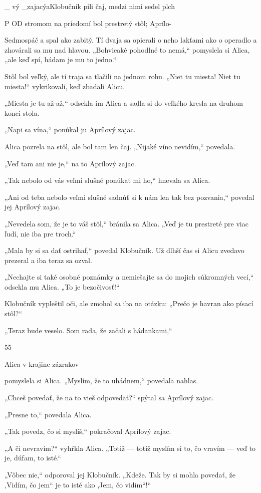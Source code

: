 \documentclass[12pt]{article}
\begin{document}
\begin{Parallel}[p]{}{}
{{_ vý _zajacýaKlobučník pili čaj, medzi nimi sedel plch

P OD stromom na priedomí bol prestretý stôl; Aprílo-

Sedmospáč a spal ako zabitý. Tí dvaja sa opierali o neho
lakťami ako o operadlo a zhovárali sa mu nad hlavou.
„Bohvieaké pohodlné to nemá,“ pomyslela si Alica, „ale
keď spí, hádam je mu to jedno.“

Stôl bol veľký, ale tí traja sa tlačili na jednom rohu. „Niet
tu miesta! Niet tu miesta!“ vykrikovali, keď zbadali Alicu.

„Miesta je tu až-až,“ odsekla im Alica a sadla si do
veľkého kresla na druhom konci stola.

„Napi sa vína,“ ponúkal ju Aprílový zajac.

Alica pozrela na stôl, ale bol tam len čaj. „Nijaké víno
nevidím,“ povedala.

„Veď tam ani nie je,“ na to Aprílový zajac.

„Tak nebolo od vás veľmi slušné ponúkať mi ho,“ hnevala
sa Alica.

„Ani od teba nebolo veľmi slušné sadnúť si k nám len tak
bez pozvania,“ povedal jej Aprílový zajac.

„Nevedela som, že je to váš stôl,“ bránila sa Alica. „Veď
je tu prestreté pre viac ľudí, nie iba pre troch.“

„Mala by si sa dať ostrihaf,“ povedal Klobučník. Už dlhší
čas si Alicu zvedavo prezeral a iba teraz sa ozval.

„Nechajte si také osobné poznámky a nemiešajte sa do
mojich súkromných vecí,“ odsekla mu Alica. „To je
bezočivosť!“

Klobučník vypleštil oči, ale zmohol sa iba na otázku:
„Prečo je havran ako písací stôl?“

„Teraz bude veselo. Som rada, že začali s hádankami,“

55

Alica v krajine zázrakov

pomyslela si Alica. „Myslím, že to uhádnem,“ povedala
nahlas.

„Chceš povedať, že na to vieš odpovedať?“ spýtal sa
Aprílový zajac.

„Presne to,“ povedala Alica.

„Tak povedz, čo si myslíš,“ pokračoval Aprílový zajac.

„A či nevravím?“ vyhŕkla Alica. „Totiž — totiž myslím si
to, čo vravím — veď to je, dúfam, to isté.“

„Vôbec nie,“ odporoval jej Klobučník. „Kdeže. Tak by si
mohla povedať, že ,Vidím, čo jem“ je to isté ako ,Jem, čo
vidím“!“

}}
\end{Parallel}
\end{document}
